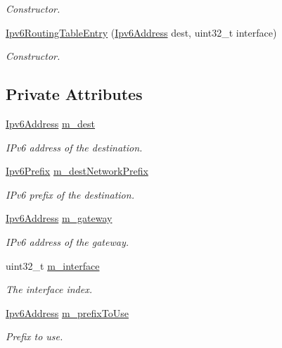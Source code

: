 \begin{DoxyCompactItemize}
\begin{DoxyCompactList}\small\item\em Constructor. \end{DoxyCompactList}\item 
\hyperlink{classns3_1_1Ipv6RoutingTableEntry_adce100868c5b03b2c49a01467c1e96d2}{Ipv6\+Routing\+Table\+Entry} (\hyperlink{classns3_1_1Ipv6Address}{Ipv6\+Address} dest, uint32\+\_\+t interface)
\begin{DoxyCompactList}\small\item\em Constructor. \end{DoxyCompactList}\end{DoxyCompactItemize}
\subsection*{Private Attributes}
\begin{DoxyCompactItemize}
\item 
\hyperlink{classns3_1_1Ipv6Address}{Ipv6\+Address} \hyperlink{classns3_1_1Ipv6RoutingTableEntry_a5e269d48ed7d9a992dbc95fb68128826}{m\+\_\+dest}
\begin{DoxyCompactList}\small\item\em I\+Pv6 address of the destination. \end{DoxyCompactList}\item 
\hyperlink{classns3_1_1Ipv6Prefix}{Ipv6\+Prefix} \hyperlink{classns3_1_1Ipv6RoutingTableEntry_ab2925ceb15892b5c030bf74381affcf7}{m\+\_\+dest\+Network\+Prefix}
\begin{DoxyCompactList}\small\item\em I\+Pv6 prefix of the destination. \end{DoxyCompactList}\item 
\hyperlink{classns3_1_1Ipv6Address}{Ipv6\+Address} \hyperlink{classns3_1_1Ipv6RoutingTableEntry_a10a62f82acb3f1f3d4f26f886d915d67}{m\+\_\+gateway}
\begin{DoxyCompactList}\small\item\em I\+Pv6 address of the gateway. \end{DoxyCompactList}\item 
uint32\+\_\+t \hyperlink{classns3_1_1Ipv6RoutingTableEntry_ab6cb2c1f75bd8a9898404788138d901d}{m\+\_\+interface}
\begin{DoxyCompactList}\small\item\em The interface index. \end{DoxyCompactList}\item 
\hyperlink{classns3_1_1Ipv6Address}{Ipv6\+Address} \hyperlink{classns3_1_1Ipv6RoutingTableEntry_aa4ab4ecb6127d76ac2fff1938043d4f8}{m\+\_\+prefix\+To\+Use}
\begin{DoxyCompactList}\small\item\em Prefix to use. \end{DoxyCompactList}\end{DoxyCompactItemize}


